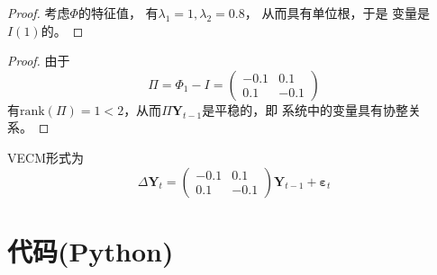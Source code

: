 \documentclass[cn]{homework}
\begin{document}
    \problem
    \begin{subproblem}[(\alph*)]
        \def\by{\boldsymbol Y}
        \def\be{\boldsymbol\varepsilon}
        \item
        \begin{proof}
            考虑$\Phi$的特征值，
            有$\lambda_1=1,\lambda_2=0.8$，
            从而具有单位根，于是
            变量是$I(1)$的。
        \end{proof}

        \item
        \begin{proof}
            由于
            \[\Pi=\Phi_1-I=\begin{pmatrix}
                -0.1 & 0.1 \\
                0.1  & -0.1
            \end{pmatrix}\]
            有$\mathrm{rank}(\Pi)=1<2$，从而$\Pi\by_{t-1}$是平稳的，即
            系统中的变量具有协整关系。
        \end{proof}

        \item
        VECM形式为
        \[\Delta\by_t=\begin{pmatrix}
            -0.1 & 0.1 \\
            0.1  & -0.1
        \end{pmatrix}\by_{t-1}
        +\be_t\]
    \end{subproblem}

    \appendix
    \section{代码(Python)}
    
\end{document}

